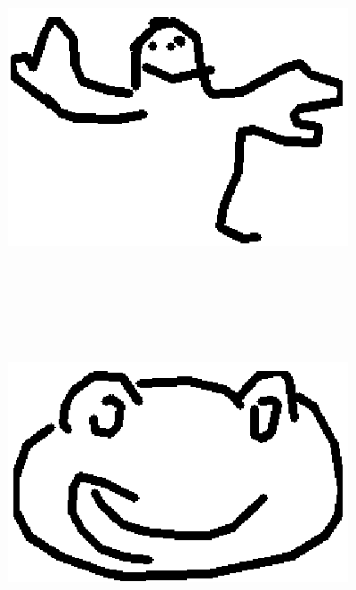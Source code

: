 \begin{center}
\includegraphics[width=9cm,height=9cm,keepaspectratio]{figures/frog_draw_3.png}
\includegraphics[width=9cm,height=9cm,keepaspectratio]{figures/frog_draw_4.png}


\end{center}




























